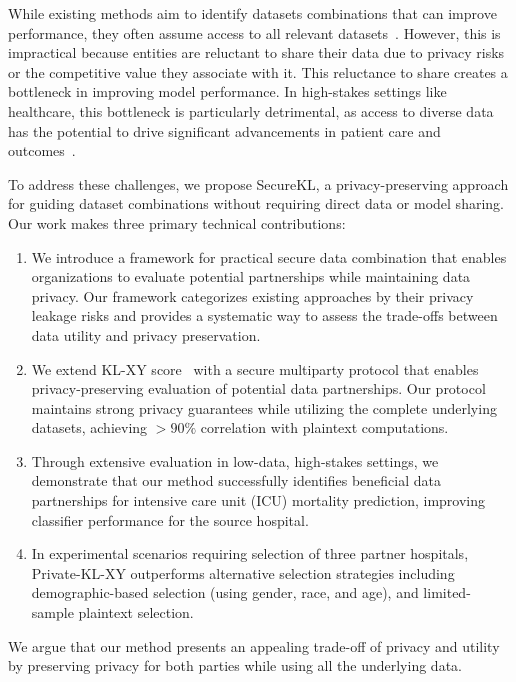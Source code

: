 While existing methods aim to identify datasets combinations that can improve performance, they often assume access to all relevant datasets~\cite{shen2024data,ilyas2022datamodels}. However, this is impractical because entities are reluctant to share their data due to privacy risks or the competitive value they associate with it. This reluctance to share creates a bottleneck in improving model performance. In high-stakes settings like healthcare, this bottleneck is particularly detrimental, as access to diverse data has the potential to drive significant advancements in patient care and outcomes~\cite{beam2018big,ghassemi2019practical,chen2020treating,beaulieu2019trends}. 

To address these challenges, we propose SecureKL, a privacy-preserving approach for guiding dataset combinations without requiring direct data or model sharing. Our work makes three primary technical contributions:

\begin{enumerate}
\item We introduce a framework for practical secure data combination that enables organizations to evaluate potential partnerships while maintaining data privacy. Our framework categorizes existing approaches by their privacy leakage risks and provides a systematic way to assess the trade-offs between data utility and privacy preservation.
\item We extend KL-XY score~\cite{shen2024data} with a secure multiparty protocol that enables privacy-preserving evaluation of potential data partnerships. Our protocol maintains strong privacy guarantees while utilizing the complete underlying datasets, achieving $>90\%$ correlation with plaintext computations.
\item  Through extensive evaluation in low-data, high-stakes settings, we demonstrate that our method successfully identifies beneficial data partnerships for intensive care unit (ICU) mortality prediction, improving classifier performance for the source hospital.

\item In experimental scenarios requiring selection of three partner hospitals, Private-KL-XY outperforms alternative selection strategies including demographic-based selection (using gender, race, and age), and limited-sample plaintext selection.
\end{enumerate}

We argue that our method presents an appealing trade-off of privacy and utility by preserving privacy for both parties while using all the underlying data.
